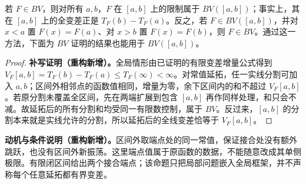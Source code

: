 \documentclass[../../main.tex]{subfiles}%
\begin{document}
\begin{proposition}\label{proposition:ch03-bv-extension}
若 $F\in BV$，则对所有 $a,b$，$F$ 在 $[a,b]$ 上的限制属于 $BV([a,b])$；事实上，其在 $[a,b]$ 上的全变差正是 $T_F(b)-T_F(a)$。反之，若 $F\in BV([a,b])$，并对 $x<a$ 置 $F(x)=F(a)$、对 $x>b$ 置 $F(x)=F(b)$，则 $F\in BV$。通过这一方法，下面为 $BV$ 证明的结果也能用于 $BV([a,b])$。
\end{proposition}
\begin{proof}
\textbf{补写证明（重构新增）。}全局情形由已证明的有限变差增量公式得到 $V_F[a,b]=T_F(b)-T_F(a)\le T_F(\infty)<\infty$。对常值延拓，任一实线分割可加入 $a,b$；区间外相邻点的函数值相同，增量为零，余下区间内的和不超过 $V_F[a,b]$。若原分割未覆盖全区间，先在两端扩展到包含 $[a,b]$ 再作同样处理，和只会不减。故延拓后的所有分割和均受同一有限数控制，属于 $BV$。反过来，$[a,b]$ 的分割本来就是实线允许的分割，所以延拓后的全线变差恰等于 $V_F[a,b]$。
\end{proof}
\begin{remark}
\textbf{动机与条件说明（重构新增）。}区间外取端点处的同一常值，保证接合处没有额外跳跃，也没有区间外新振荡。这里端点值属于原函数的数据，不能随意改成其单侧极限。有限闭区间给出两个接合端点；该命题只把局部问题嵌入全局框架，并不声称每个任意延拓都有界变差。
\end{remark}
\end{document}
